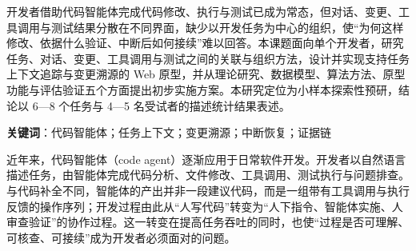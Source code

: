 %
%
%

\makeatletter
\renewcommand{\theHtable}{\thetable}
\renewcommand{\theHfigure}{\thefigure}
\makeatother

\iftjproposalabstract
{}

开发者借助代码智能体完成代码修改、执行与测试已成为常态，但对话、变更、工具调用与测试结果分散在不同界面，缺少以开发任务为中心的组织，使“为何这样修改、依据什么验证、中断后如何接续”难以回答。本课题面向单个开发者，研究任务、对话、变更、工具调用与测试之间的关联与组织方法，设计并实现支持任务上下文追踪与变更溯源的 Web 原型，并从理论研究、数据模型、算法方法、原型功能与评估验证五个方面提出初步实施方案。本研究定位为小样本探索性预研，结论以 6—8 个任务与 4—5 名受试者的描述统计结果表述。

\textbf{关键词}：代码智能体；任务上下文；变更溯源；中断恢复；证据链
\fi



近年来，代码智能体（code agent）逐渐应用于日常软件开发。开发者以自然语言描述任务，由智能体完成代码分析、文件修改、工具调用、测试执行与问题排查。与代码补全不同，智能体的产出并非一段建议代码，而是一组带有工具调用与执行反馈的操作序列；开发过程由此从“人写代码”转变为“人下指令、智能体实施、人审查验证”的协作过程。这一转变在提高任务吞吐的同时，也使“过程是否可理解、可核查、可接续”成为开发者必须面对的问题。


